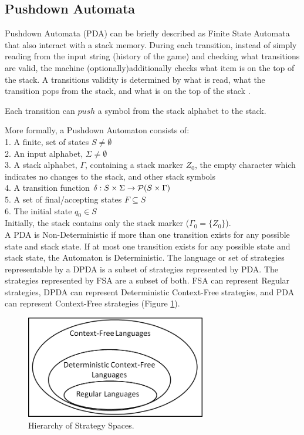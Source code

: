 \documentclass[a4paper,11pt,bcshonoursthesis,singlespace,oneside,thesisdraft,pdflatex]{cssethesis}
\begin{document}
\subsection{Pushdown Automata}
Pushdown Automata (PDA) can be briefly described as Finite State Automata that also interact with a stack memory. During each transition, instead of simply reading from the input string (history of the game) and checking what transitions are valid, the machine (optionally)additionally checks what item is on the top of the stack. 
A transitions validity is determined by what is read, what the transition pops from the stack, and what is on the top of the stack \citep[][pp 99 -- 122]{Sipser2006}. 

Each transition can $push$ a symbol from the stack alphabet to the stack. 

More formally, a Pushdown Automaton consists of:\\
1. A finite, set of states $S \neq  \emptyset$\\
2. An input alphabet, $\Sigma \neq  \emptyset$\\
3. A stack alphabet, $\Gamma$, containing a stack marker $Z_0$, the empty character which indicates no changes to the stack, and other stack symbols\\
4. A transition function $\delta : S \times \Sigma \time \Gamma \rightarrow \mathcal P(S \times \Gamma)$\\
5. A set of final/accepting states $F \subseteq S$ \\
6. The initial state $q_0 \in S$\\

Initially, the stack contains only the stack marker ($\Gamma_0=\{Z_0\}$).\\

A PDA is Non-Deterministic if more than one transition exists for any possible state and stack state.  If at most one transition exists for any possible state and stack state, the Automaton is Deterministic. The language or set of strategies representable by a DPDA is a subset of strategies represented by PDA. The strategies represented by FSA are a subset of both. FSA can represent Regular strategies, DPDA can represent Deterministic Context-Free strategies, and PDA can represent Context-Free strategies (Figure \ref{fig:languages}).

\begin{figure}[h]
\centering
\includegraphics[width=0.7\textwidth]{languages}
\caption{Hierarchy of Strategy Spaces.}
\label{fig:languages}
\end{figure}
\end{document}
